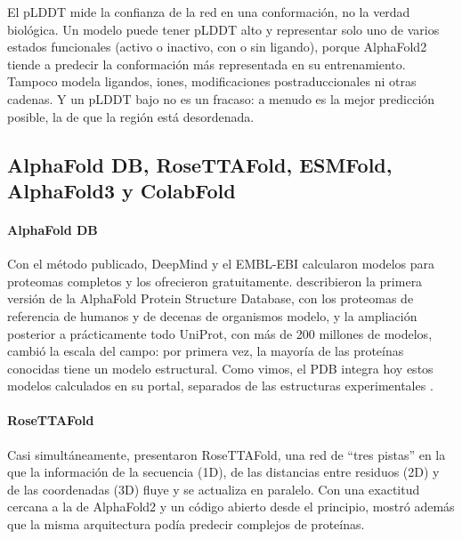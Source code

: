 \begin{cuidado}
El pLDDT mide la confianza de la red en una conformación, no la verdad biológica. Un modelo puede tener pLDDT alto y representar solo uno de varios estados funcionales (activo o inactivo, con o sin ligando), porque AlphaFold2 tiende a predecir la conformación más representada en su entrenamiento. Tampoco modela ligandos, iones, modificaciones postraduccionales ni otras cadenas. Y un pLDDT bajo no es un fracaso: a menudo es la mejor predicción posible, la de que la región está desordenada.
\end{cuidado}

\subsection{AlphaFold DB, RoseTTAFold, ESMFold, AlphaFold3 y ColabFold}

\paragraph{AlphaFold DB} Con el método publicado, DeepMind y el EMBL-EBI calcularon modelos para proteomas completos y los ofrecieron gratuitamente. \textcite{c15-varadi2022} describieron la primera versión de la AlphaFold Protein Structure Database, con los proteomas de referencia de humanos y de decenas de organismos modelo, y la ampliación posterior a prácticamente todo UniProt, con más de 200 millones de modelos, cambió la escala del campo: por primera vez, la mayoría de las proteínas conocidas tiene un modelo estructural. Como vimos, el PDB integra hoy estos modelos calculados en su portal, separados de las estructuras experimentales \parencite{c15-burley2023}.

\paragraph{RoseTTAFold} Casi simultáneamente, \textcite{c15-baek2021} presentaron RoseTTAFold, una red de ``tres pistas'' en la que la información de la secuencia (1D), de las distancias entre residuos (2D) y de las coordenadas (3D) fluye y se actualiza en paralelo. Con una exactitud cercana a la de AlphaFold2 y un código abierto desde el principio, mostró además que la misma arquitectura podía predecir complejos de proteínas.

